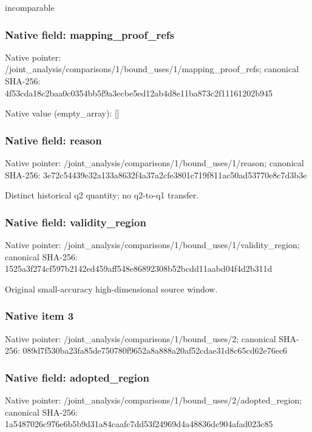 \documentclass[10pt,a4paper]{article}
\begin{document}
\begingroup\raggedright\sloppy incomparable\par\endgroup

\subsubsection{Native field: mapping\_\allowbreak{}proof\_\allowbreak{}refs}
Native pointer: /joint\_\allowbreak{}analysis/comparisons/1/bound\_\allowbreak{}uses/1/mapping\_\allowbreak{}proof\_\allowbreak{}refs; canonical SHA-256: 4f53cda18c2baa0c0354bb5f9a3ecbe5ed12ab4d8e11ba873c2f11161202b945

Native value (empty\_\allowbreak{}array): []

\subsubsection{Native field: reason}
Native pointer: /joint\_\allowbreak{}analysis/comparisons/1/bound\_\allowbreak{}uses/1/reason; canonical SHA-256: 3e72c54439e32a133a8632f4a37a2cfe3801c719f811ac50ad53770e8c7d3b3e

\begingroup\raggedright\sloppy Distinct historical q2 quantity;\allowbreak{} no q2-to-q1 transfer.\par\endgroup

\subsubsection{Native field: validity\_\allowbreak{}region}
Native pointer: /joint\_\allowbreak{}analysis/comparisons/1/bound\_\allowbreak{}uses/1/validity\_\allowbreak{}region; canonical SHA-256: 1525a3f274cf597b2142ed459aff548e86892308b52bcdd11aabd04f4d2b311d

\begingroup\raggedright\sloppy Original small-accuracy high-dimensional source window.\par\endgroup

\subsubsection{Native item 3}
Native pointer: /joint\_\allowbreak{}analysis/comparisons/1/bound\_\allowbreak{}uses/2; canonical SHA-256: 089d7f530ba23fa85de750780f9652a8a888a20af52cdae31d8c65cd62e76ec6

\subsubsection{Native field: adopted\_\allowbreak{}region}
Native pointer: /joint\_\allowbreak{}analysis/comparisons/1/bound\_\allowbreak{}uses/2/adopted\_\allowbreak{}region; canonical SHA-256: 1a5487026c976e6b5b9d31a84caafc7dd53f24969d4a48836dc904afad023c85
\end{document}
